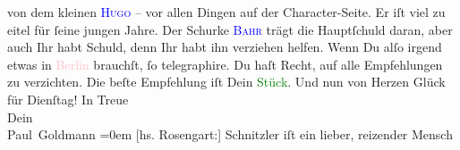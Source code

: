                von dem kleinen \textsc{\textcolor{blue}{Hugo}{}\ledrightnote{\textcolor{blue}{Hugo von Hofmannsthal}}} – vor allen  Dingen auf der Character-Seite.
               Er iſt viel zu eitel für ſeine jungen Jahre. Der Schurke \textsc{\textcolor{blue}{Bahr}{}\ledrightnote{\textcolor{blue}{Hermann Bahr}}} trägt {\pb}die Hauptſchuld daran, aber auch Ihr
               habt Schuld, denn Ihr habt ihn verziehen helfen. {\dotsfour}\pend
           \pstart
           Wenn Du alſo irgend etwas in \textcolor{pink}{Berlin}{}\ledrightnote{\textcolor{pink}{Berlin}} brauchſt, ſo
               telegraphire. Du haſt Recht, auf alle Empfehlungen zu verzichten. Die beſte
               Empfehlung iſt Dein \textcolor{green}{Stück}{}.\pend
           \pstart
           Und nun von Herzen Glück für Dienſtag!\pend
           \pstart
           In Treue{\\[\baselineskip]}Dein {\\[\baselineskip]}\spacefill\mbox{Paul Goldmann}\pend
           \leftskip=0em{}\pstart
           \noindent{}\label{T_L02766-1v}\label{T_L02766-1h}\pend
           \pstart
           {\pb}{[}hs. Rosengart:{]} Schnitzler iſt ein lieber, reizender Mensch\pend
           \endnumbering{}  
      